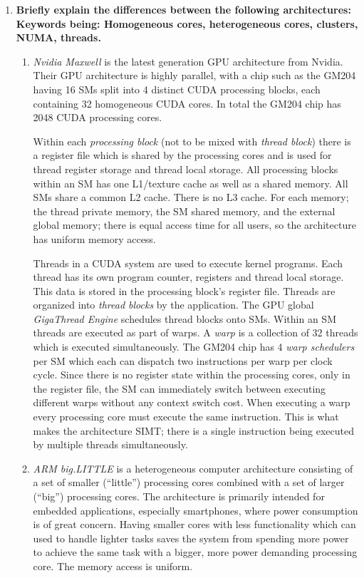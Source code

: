 \begin{enumerate}

\item \textbf{Briefly explain the differences between the following architectures:\\
Keywords being: Homogeneous cores, heterogeneous cores, clusters, NUMA, threads.}

\begin{enumerate}
\item \textit{Nvidia Maxwell} is the latest generation \ac{GPU} architecture from Nvidia. Their \ac{GPU} architecture is highly parallel, with a chip such as the GM204 having 16 \acp{SM} split into 4 distinct \ac{CUDA} processing blocks, each containing 32 homogeneous \ac{CUDA} cores. In total the GM204 chip has 2048 \ac{CUDA} processing cores.

Within each \textit{processing block} (not to be mixed with \textit{thread block}) there is a register file which is shared by the processing cores and is used for thread register storage and thread local storage. All processing blocks within an \ac{SM} has one L1/texture cache as well as a shared memory. All \acp{SM} share a common L2 cache. There is no L3 cache. For each memory; the thread private memory, the \ac{SM} shared memory, and the external global memory; there is equal access time for all users, so the architecture has uniform memory access.

Threads in a \ac{CUDA} system are used to execute kernel programs. Each thread has its own program counter, registers and thread local storage. This data is stored in the processing block's register file. Threads are organized into \textit{thread blocks} by the application. The \ac{GPU} global \textit{GigaThread Engine} schedules thread blocks onto \acp{SM}. Within an \ac{SM} threads are executed as part of warps. A \textit{warp} is a collection of 32 threads which is executed simultaneously. The GM204 chip has 4 \textit{warp schedulers} per \ac{SM} which each can dispatch two instructions per warp per clock cycle. Since there is no register state within the processing cores, only in the register file, the \ac{SM} can immediately switch between executing different warps without any context switch cost. When executing a warp every processing core must execute the same instruction. This is what makes the architecture \ac{SIMT}; there is a single instruction being executed by multiple threads simultaneously. 

\item \textit{ARM big.LITTLE} is a heterogeneous computer architecture consisting of a set of smaller (``little'') processing cores combined with a set of larger (``big'') processing cores. The architecture is primarily intended for embedded applications, especially smartphones, where power consumption is of great concern. Having smaller cores with less functionality which can used to handle lighter tasks saves the system from spending more power to achieve the same task with a bigger, more power demanding processing core. The memory access is uniform. 


\end{enumerate}
\end{enumerate}
